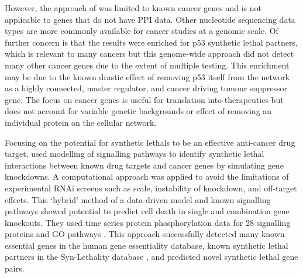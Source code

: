 However, the approach of \citet{Kranthi2013} was limited to known \glspl{cancer gene} and is not applicable to genes that do not have \gls{PPI} data. Other nucleotide sequencing data types are more commonly available for cancer studies at a \gls{genomic} scale. Of further concern is that the results were enriched for p53 \gls{synthetic lethal} partners, which is relevant to many \glspl{cancer} but this \gls{genome}-wide approach did not detect many other \glspl{cancer gene} due to the extent of multiple testing. This enrichment may be due to the known drastic effect of removing p53 itself from the network as a highly connected, master regulator, and cancer driving \gls{tumour suppressor} gene. The focus on \glspl{cancer gene} is useful for translation into therapeutics but does not account for variable genetic backgrounds or effect of removing an individual protein on the cellular network.  

Focusing on the potential for \glspl{synthetic lethal} to be an effective anti-cancer drug target, \citet{Zhang2015} used modelling of signalling pathways to identify \gls{synthetic lethal} interactions between known drug targets and \glspl{cancer gene} by simulating gene knockdowns. A computational approach was applied to avoid the limitations of experimental \gls{RNAi} screens such as scale, instability of knockdown, and off-target effects. This `hybrid' method of a data-driven model and known signalling pathways showed potential to predict cell death in single and combination gene knockouts. They used time series protein phosphorylation data \citep{Lee2012} for 28 signalling proteins and \gls{GO} \glspl{pathway} \citep{Ashburner2000, Blake2015}. This approach successfully detected many known \gls{essential} genes in the human gene essentiality database, known \gls{synthetic lethal} partners in the Syn-Lethality database \citep{Li2014}, and predicted novel \gls{synthetic lethal} gene pairs. %

